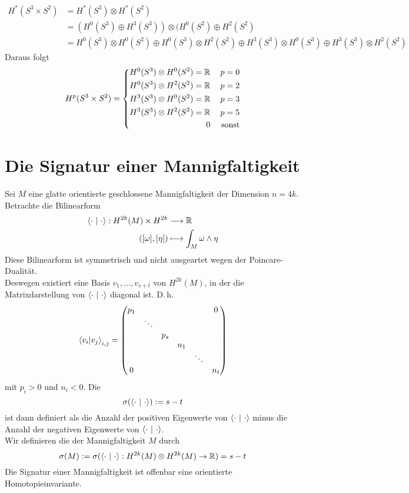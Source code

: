 \Bsp{}
\begin{align*}
H^*(S^3 \times S^2)&=H^*(S^3)\otimes H^*(S^2)\\
&= (H^0(S^3)\oplus H^3(S^3)) \otimes (H^0(S^2) \oplus H^2(S^2)\\
&= H^0(S^3)\otimes H^0(S^2) \oplus H^0(S^3) \otimes H^2(S^2) 
\oplus H^3(S^3) \otimes H^0(S^3) \oplus H^3(S^3)\otimes H^2(S^2)
\end{align*}
Daraus folgt
\begin{align*}
H^p(S^3 \times S^2) =
\left\lbrace
\begin{aligned}
H^0(S^3)\otimes H^0(S^2) = \mathbb{R} && p= 0\\
H^0(S^3)\otimes H^2(S^2) = \mathbb{R} && p= 2\\
H^3(S^3)\otimes H^0(S^2) = \mathbb{R} && p= 3\\
H^3(S^3)\otimes H^2(S^2) = \mathbb{R} && p= 5\\
0 && \text{ sonst}
\end{aligned}
\right.
\end{align*}

\section{Die Signatur einer Mannigfaltigkeit}
Sei $M$ eine glatte orientierte geschlossene Mannigfaltigkeit der Dimension $n = 4k$.\\
Betrachte die Bilinearform
\begin{align*}
\left<\cdot ~|~\cdot\right>: H^{2k}(M) \times H^{2k} & \overset{}{\longrightarrow} \mathbb{R}\\
([\omega], [\eta]) &\longmapsto \int_M \omega \wedge \eta
\end{align*}
Diese Bilinearform ist symmetrisch und nicht ausgeartet wegen der Poincare-Dualität.\\
Deswegen existiert eine Basis $v_1, \ldots, v_{s+t}$ von $H^{2k}(M)$, in der die Matrixdarstellung von $\left<\cdot~|~\cdot\right>$ diagonal ist. D.\,h.
\[ \left<v_i|v_j\right>_{i,j} = \left(
\begin{matrix}
	p_1 &        &     &     &        &  0   \\
	    & \ddots &     &     &        &  \\
	    &        & p_s &     &        &     \\
	    &        &     & n_1 &        &     \\
	    &        &     &     & \ddots &     \\
	0    &        &     &     &        & n_t
\end{matrix}
\right) \]
mit $p_i >0$ und $n_i< 0$. Die  
\[\sigma(\left<\cdot~|~\cdot\right>):= s-t\]
ist dann definiert als die Anzahl der positiven Eigenwerte von $\left<\cdot~|~\cdot\right>$ minus die Anzahl der negativen Eigenwerte von $\left<\cdot~|~\cdot\right>$.\\
Wir definieren die  der Mannigfaltigkeit $M$ durch
\[ \sigma(M):= \sigma(\left<\cdot~|~\cdot\right> : H^{2k}(M) \otimes H^{2k}(M) \overset{}{\rightarrow} \mathbb{R})= s-t\]
Die Signatur einer Mannigfaltigkeit ist offenbar eine orientierte Homotopieinvariante.

